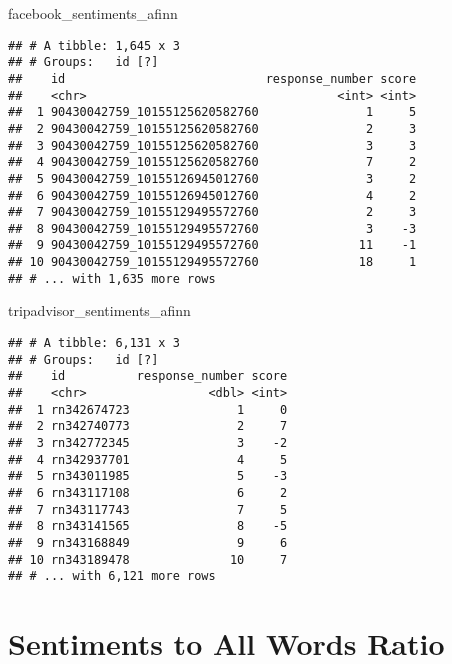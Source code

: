 \documentclass[]{article}
\newenvironment{Shaded}{\begin{snugshade}}{\end{snugshade}}
\newcommand{\NormalTok}[1]{#1}
\begin{document}
\begin{Shaded}
\begin{Highlighting}[]
\NormalTok{facebook_sentiments_afinn }
\end{Highlighting}
\end{Shaded}

\begin{verbatim}
## # A tibble: 1,645 x 3
## # Groups:   id [?]
##    id                            response_number score
##    <chr>                                   <int> <int>
##  1 90430042759_10155125620582760               1     5
##  2 90430042759_10155125620582760               2     3
##  3 90430042759_10155125620582760               3     3
##  4 90430042759_10155125620582760               7     2
##  5 90430042759_10155126945012760               3     2
##  6 90430042759_10155126945012760               4     2
##  7 90430042759_10155129495572760               2     3
##  8 90430042759_10155129495572760               3    -3
##  9 90430042759_10155129495572760              11    -1
## 10 90430042759_10155129495572760              18     1
## # ... with 1,635 more rows
\end{verbatim}

\begin{Shaded}
\begin{Highlighting}[]
\NormalTok{tripadvisor_sentiments_afinn}
\end{Highlighting}
\end{Shaded}

\begin{verbatim}
## # A tibble: 6,131 x 3
## # Groups:   id [?]
##    id          response_number score
##    <chr>                 <dbl> <int>
##  1 rn342674723               1     0
##  2 rn342740773               2     7
##  3 rn342772345               3    -2
##  4 rn342937701               4     5
##  5 rn343011985               5    -3
##  6 rn343117108               6     2
##  7 rn343117743               7     5
##  8 rn343141565               8    -5
##  9 rn343168849               9     6
## 10 rn343189478              10     7
## # ... with 6,121 more rows
\end{verbatim}

\section{Sentiments to All Words
Ratio}\label{sentiments-to-all-words-ratio}
\end{document}
